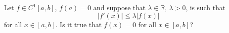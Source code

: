 Let \(f\in C^1[a,b]\), \(f(a)=0\) and suppose that \(\lambda\in\mathbb R\), \(\lambda >0\), is such that
\[|f'(x)|\leq \lambda |f(x)|\]for all \(x\in [a,b]\). Is it true that \(f(x)=0\) for all \(x\in [a,b]\)?